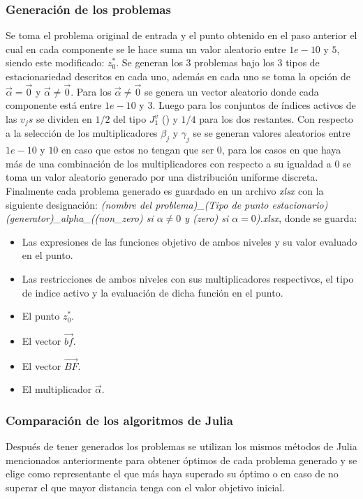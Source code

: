 \subsubsection{Generación de los problemas}
Se toma el problema original de entrada y el punto obtenido en el paso anterior el cual en cada componente se le hace suma un
valor aleatorio entre $1e-10$ y $5$, siendo este modificado: $z^*_0$. 
Se generan los 3 problemas bajo los 3 tipos de estacionariedad descritos en cada uno, 
además en cada uno se toma la opción de $\vec{\alpha}=\vec{0}$ y $\vec{\alpha}\ne \vec{0}$.
Para los $\vec{\alpha}\neq \vec{0}$ se genera un vector aleatorio donde cada componente está entre $1e-10$ y $3$.
Luego para los conjuntos de índices activos de las $v_{j}s$ se dividen en $1/2$ del tipo $J_1^v$ () y $1/4$ para los dos restantes.
Con respecto a la selección de los multiplicadores $\beta_j$ y $\gamma_j$ se 
se generan valores aleatorios entre $1e-10$ y $10$ en caso que estos no tengan que ser $0$, 
para los casos en que haya más de una combinación de los multiplicadores con respecto a su igualdad a $0$
se toma un valor aleatorio generado por una distribución uniforme discreta.
Finalmente cada problema generado es guardado en un archivo \textit{xlsx} con la siguiente designación:
\textit{(nombre del problema)\_(Tipo de punto estacionario)(generator)\_alpha\_((non\_zero) si $\alpha \neq 0$ y (zero) si $\alpha = 0$).xlsx},
donde se guarda: 
\begin{itemize}
    \item Las expresiones de las funciones objetivo de ambos niveles y su valor evaluado en el punto.
    \item Las restricciones de ambos niveles con sus multiplicadores respectivos, el tipo de indice activo y la evaluación de dicha función en el punto.
    \item El punto $z^*_0$.
    \item El vector $\vec{bf}.$
    \item El vector $\vec{BF}$.
    \item El multiplicador $\vec{\alpha}$.
\end{itemize}

\subsubsection{Comparación de los algoritmos de Julia}
Después de tener generados los problemas se utilizan los mismos métodos de Julia mencionados anteriormente
para obtener óptimos de cada problema generado y se elige como representante el que más haya superado su óptimo o en caso de no superar el que mayor distancia tenga con el valor objetivo inicial.

